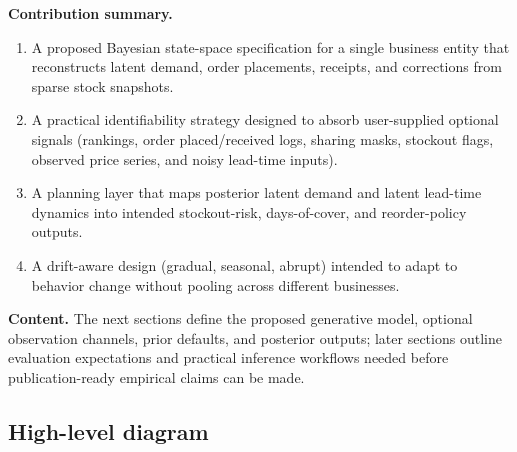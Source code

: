 \documentclass[11pt]{article}
\begin{document}
\textbf{Contribution summary.}
\begin{enumerate}
  \item A proposed Bayesian state-space specification for a single business entity that reconstructs latent demand, order placements, receipts, and corrections from sparse stock snapshots.
  \item A practical identifiability strategy designed to absorb user-supplied optional signals (rankings, order placed/received logs, sharing masks, stockout flags, observed price series, and noisy lead-time inputs).
  \item A planning layer that maps posterior latent demand and latent lead-time dynamics into intended stockout-risk, days-of-cover, and reorder-policy outputs.
  \item A drift-aware design (gradual, seasonal, abrupt) intended to adapt to behavior change without pooling across different businesses.
\end{enumerate}

\textbf{Content.} The next sections define the proposed generative model, optional observation channels, prior defaults, and posterior outputs; later sections outline evaluation expectations and practical inference workflows needed before publication-ready empirical claims can be made.

\subsection*{High-level diagram}
\end{document}
